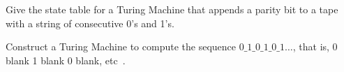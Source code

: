 \begin{questions}
\begin{solution}
\end{solution}


\question
Give the state table for a Turing Machine that appends a parity bit to a tape with a string of consecutive 0's and 1's.


\begin{solution}
\end{solution}

\question
Construct a Turing Machine to compute the sequence $0\_1\_0\_1\_0\_1\ldots$, that is, 0 blank 1 blank 0 blank, etc~\cite{turing}.

\end{questions}

